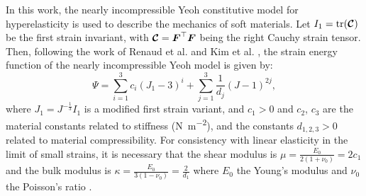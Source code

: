 In this work, the nearly incompressible Yeoh constitutive model for hyperelasticity is used to describe the mechanics of soft materials. Let $I_1 = \textrm{tr}(\boldsymbol{\mathcal{C}})$ be the first strain invariant, with $\boldsymbol{\mathcal{C}} = \boldsymbol{F}^\top \boldsymbol{F}$ being the right Cauchy strain tensor. Then, following the work of Renaud et al. \cite{Renaud2011} and Kim et al. \cite{Kim2018}, the strain energy function of the nearly incompressible Yeoh model is given by:
%
\begin{equation}
{\Psi} = \sum_{i = 1}^{3} c_i (J_1 - 3)^i + \sum_{j = 1}^{3} \frac{1}{d_j} (J - 1)^{2j},
\label{eq:C3:psi_model_yeoh}
\end{equation}
%
where $J_1 = J^{-\tfrac{1}{3}} I_1$ is a modified first strain variant, and $c_1 > 0$ and $c_2$, $c_3$ are the material constants related to stiffness (\si{\newton \per \square \meter}), and the constants $d_{1,2,3} > 0$ related to material compressibility. For consistency with linear elasticity in the limit of small strains, it is necessary that the shear modulus is $\mu = \tfrac{E_0}{2(1+\nu_0)} = 2 c_1$ and the bulk modulus is $\kappa = \tfrac{E_0}{3(1-\nu_0)} = \tfrac{2}{d_1}$ where $E_0$ the Young's modulus and $\nu_0$ the Poisson's ratio \cite{Holzapfel2002,Kim2018}. %


